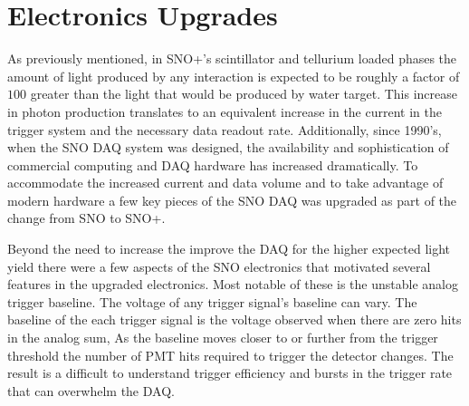 

\section{Electronics Upgrades}
\label{sec:upgrades}
As previously mentioned, in SNO+'s scintillator and tellurium loaded phases the
amount of light produced by any interaction is expected to be roughly a factor
of $100$ greater than the light that would be produced by water target.
This increase in photon production translates to an equivalent increase in the
current in the trigger system and the necessary data readout rate.
Additionally, since 1990's, when the SNO DAQ system was designed, the availability
and sophistication of commercial computing and DAQ hardware has increased
dramatically.
To accommodate the increased current and data volume and to take advantage of modern
hardware a few key pieces of the SNO DAQ was upgraded as part of the change from
SNO to SNO+.

Beyond the need to increase the improve the DAQ for the higher expected light
yield there were a few aspects of the SNO electronics that motivated several
features in the upgraded electronics.
Most notable of these is the unstable analog trigger baseline.
The voltage of any trigger signal's baseline can vary.
The baseline of the each trigger signal is the voltage observed
when there are zero hits in the analog sum,
As the baseline moves closer to or further from the trigger threshold
the number of PMT hits required to trigger the detector changes.
The result is a difficult to understand trigger efficiency and bursts in the trigger
rate that can overwhelm the DAQ\@.

